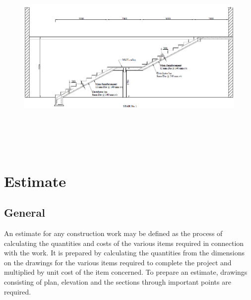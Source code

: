  \begin{figure}[H]
	
	\centering
	\includegraphics[width=\linewidth,height=10cm] {./images/stair1.png}
	
	\label{manual}
\end{figure}
\chapter{Estimate}
\section{General}
An estimate for any construction work may be defined as the process of calculating the quantities and costs of the various items required in connection with the work. It is prepared by calculating the quantities from the dimensions on the drawings for the various items required to complete the project and multiplied by unit cost of the item concerned. To prepare an estimate, drawings consisting of plan, elevation and the sections through important points are required.
